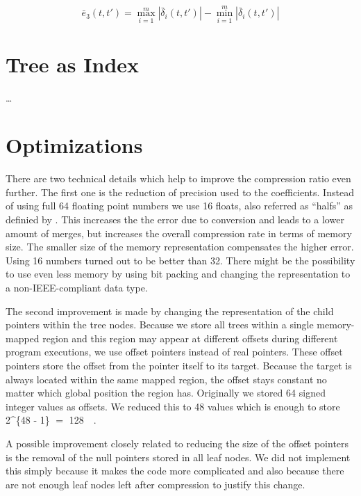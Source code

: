 \begin{equation}\label{eq:e3_up}
    \bar{e}_3\left(t, t'\right) = \max_{i=1}^m \left|\bar{\delta}_i(t, t')\right| - \min_{i=1}^m \left|\bar{\delta}_i(t, t')\right|
\end{equation}



\section{Tree as Index}
\label{sec:algorithm:asindex}

\dots



\section{Optimizations}
\label{sec:algorithm:opt}

There are two technical details which help to improve the compression ratio even further. The first one is the reduction of precision used to the coefficients. Instead of using full \SI{64}{\bit} floating point numbers we use \SI{16}{\bit} floats, also referred as \enquote{halfs} as definied by \cite{ieee_float}. This increases the the error due to conversion and leads to a lower amount of merges, but increases the overall compression rate in terms of memory size. The smaller size of the memory representation compensates the higher error. Using \SI{16}{\bit} numbers turned out to be better than \SI{32}{\bit}. There might be the possibility to use even less memory by using bit packing and changing the representation to a non-IEEE-compliant data type.

The second improvement is made by changing the representation of the child pointers within the tree nodes. Because we store all trees within a single memory-mapped region and this region may appear at different offsets during different program executions, we use offset pointers instead of real pointers. These offset pointers store the offset from the pointer itself to its target. Because the target is always located within the same mapped region, the offset stays constant no matter which global position the region has. Originally we stored \SI{64}{\bit} signed integer values as offsets. We reduced this to \SI{48}{\bit} values which is enough to store \SI[parse-numbers = false]{2^{48 - 1}}{\byte} $=$ \SI{128}{\tera\byte}.

A possible improvement closely related to reducing the size of the offset pointers is the removal of the null pointers stored in all leaf nodes. We did not implement this simply because it makes the code more complicated and also because there are not enough leaf nodes left after compression to justify this change.



